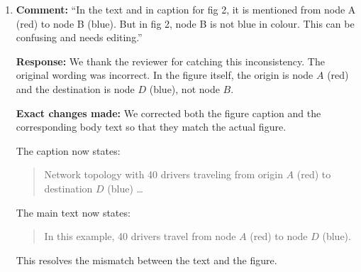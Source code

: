 \documentclass[11pt]{article}
\begin{document}
\begin{enumerate}
\textbf{Response:} We agree that the original wording did not make explicit enough that the flows in the example figures are not assigned manually. They are computed as solutions of the corresponding traffic assignment problem under the stated OD demand and link cost functions.

\textbf{Exact changes made:} We added an explicit clarification in the discussion of Fig.~1. The revised manuscript now states that, in both panels, the edge flows $f_e$ are obtained by solving the respective traffic assignment problem for a fixed OD demand of 10 drivers from $A$ to $D$ under the stated link cost functions, and that the reported $SC$ values are then computed by inserting these resulting flows into Eq.~(3).

The revised sentence reads:

\begin{quote}
In both panels, the edge flows $f_e$ are obtained by solving the respective traffic assignment problem for a fixed OD demand of 10 drivers from $A$ to $D$ under the stated link cost functions; the reported $SC$ values are then computed by inserting these resulting flows into Eq.~(3).
\end{quote}

This change makes clear both how the example flows are generated and how the social-cost values are evaluated.

\item \textbf{Comment:} ``In the text and in caption for fig 2, it is mentioned from node A (red) to node B (blue). But in fig 2, node B is not blue in colour. This can be confusing and needs editing.''

\textbf{Response:} We thank the reviewer for catching this inconsistency. The original wording was incorrect. In the figure itself, the origin is node $A$ (red) and the destination is node $D$ (blue), not node $B$.

\textbf{Exact changes made:} We corrected both the figure caption and the corresponding body text so that they match the actual figure.

The caption now states:

\begin{quote}
Network topology with 40 drivers traveling from origin $A$ (red) to destination $D$ (blue) \dots
\end{quote}

The main text now states:

\begin{quote}
In this example, 40 drivers travel from node $A$ (red) to node $D$ (blue).
\end{quote}

This resolves the mismatch between the text and the figure.
\end{enumerate}
\end{document}
